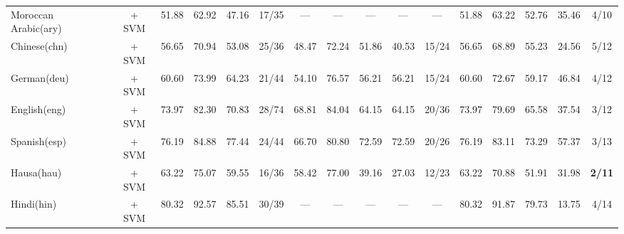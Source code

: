 \begin{table*}[h]
{\begin{tabular}{l|c|cccc|ccccc|ccccc}
            Moroccan Arabic(ary)   & \citep{wang2024multilingual}   + SVM                                   & 51.88                        & 62.92                        & 47.16                       & 17/35         & —             & —            & —              & —             & —             & 51.88          & 63.22          & 52.76          & 35.46         & 4/10          \\
            Chinese(chn)           & \citep{zpoint-large-embedding-zh} + SVM                                & 56.65                        & 70.94                        & 53.08                       & 25/36         & 48.47         & 72.24        & 51.86          & 40.53         & 15/24         & 56.65          & 68.89          & 55.23          & 24.56         & 5/12          \\
            German(deu)            & \citep{wang2024multilingual}       + SVM                               & 60.60                        & 73.99                        & 64.23                       & 21/44         & 54.10         & 76.57        & 56.21          & 56.21         & 15/24         & 60.60          & 72.67          & 59.17          & 46.84         & 4/12          \\
            English(eng)           & \citep{zhang2025jasperstelladistillationsota}  + SVM                   & 73.97                        & 82.30                        & 70.83                       & 28/74         & 68.81         & 84.04        & 64.15          & 64.15         & 20/36         & 73.97          & 79.69          & 65.58          & 37.54         & 3/12          \\
            Spanish(esp)           & \citep{wang2024multilingual}      + SVM                                & 76.19                        & 84.88                        & 77.44                       & 24/44         & 66.70         & 80.80        & 72.59          & 72.59         & 20/26         & 76.19          & 83.11          & 73.29          & 57.37         & 3/13          \\
            Hausa(hau)             & \citep{dobler-demelo-2023-focus} + SVM                                 & 63.22                        & 75.07                        & 59.55                       & 16/36         & 58.42         & 77.00        & 39.16          & 27.03         & 12/23         & 63.22          & 70.88          & 51.91          & 31.98         & \textbf{2/11} \\
            Hindi(hin)             & \citep{wang2024multilingual}  + SVM                                    & 80.32                        & 92.57                        & 85.51                       & 30/39         & —             & —            & —              & —             & —             & 80.32          & 91.87          & 79.73          & 13.75         & 4/14          \\

\end{tabular}}
\end{table*}
